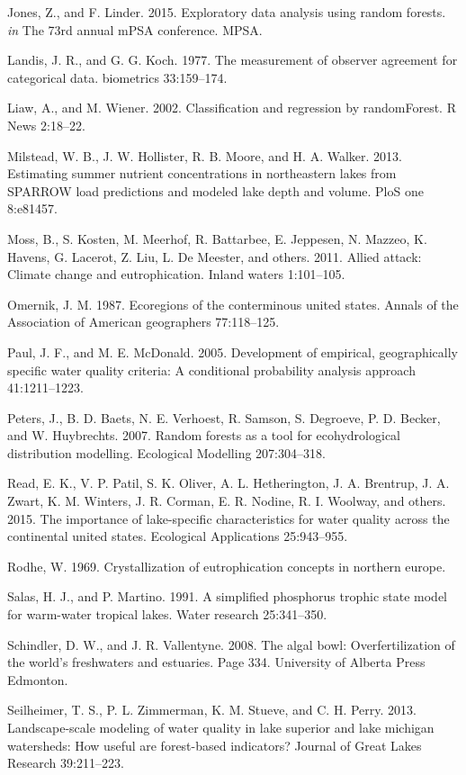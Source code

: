 \documentclass[12pt,]{article}
\begin{document}
Jones, Z., and F. Linder. 2015. Exploratory data analysis using random
forests. \emph{in} The 73rd annual mPSA conference. MPSA.

Landis, J. R., and G. G. Koch. 1977. The measurement of observer
agreement for categorical data. biometrics 33:159--174.

Liaw, A., and M. Wiener. 2002. Classification and regression by
randomForest. R News 2:18--22.

Milstead, W. B., J. W. Hollister, R. B. Moore, and H. A. Walker. 2013.
Estimating summer nutrient concentrations in northeastern lakes from
SPARROW load predictions and modeled lake depth and volume. PloS one
8:e81457.

Moss, B., S. Kosten, M. Meerhof, R. Battarbee, E. Jeppesen, N. Mazzeo,
K. Havens, G. Lacerot, Z. Liu, L. De Meester, and others. 2011. Allied
attack: Climate change and eutrophication. Inland waters 1:101--105.

Omernik, J. M. 1987. Ecoregions of the conterminous united states.
Annals of the Association of American geographers 77:118--125.

Paul, J. F., and M. E. McDonald. 2005. Development of empirical,
geographically specific water quality criteria: A conditional
probability analysis approach 41:1211--1223.

Peters, J., B. D. Baets, N. E. Verhoest, R. Samson, S. Degroeve, P. D.
Becker, and W. Huybrechts. 2007. Random forests as a tool for
ecohydrological distribution modelling. Ecological Modelling
207:304--318.

Read, E. K., V. P. Patil, S. K. Oliver, A. L. Hetherington, J. A.
Brentrup, J. A. Zwart, K. M. Winters, J. R. Corman, E. R. Nodine, R. I.
Woolway, and others. 2015. The importance of lake-specific
characteristics for water quality across the continental united states.
Ecological Applications 25:943--955.

Rodhe, W. 1969. Crystallization of eutrophication concepts in northern
europe.

Salas, H. J., and P. Martino. 1991. A simplified phosphorus trophic
state model for warm-water tropical lakes. Water research 25:341--350.

Schindler, D. W., and J. R. Vallentyne. 2008. The algal bowl:
Overfertilization of the world's freshwaters and estuaries. Page 334.
University of Alberta Press Edmonton.

Seilheimer, T. S., P. L. Zimmerman, K. M. Stueve, and C. H. Perry. 2013.
Landscape-scale modeling of water quality in lake superior and lake
michigan watersheds: How useful are forest-based indicators? Journal of
Great Lakes Research 39:211--223.
\end{document}
